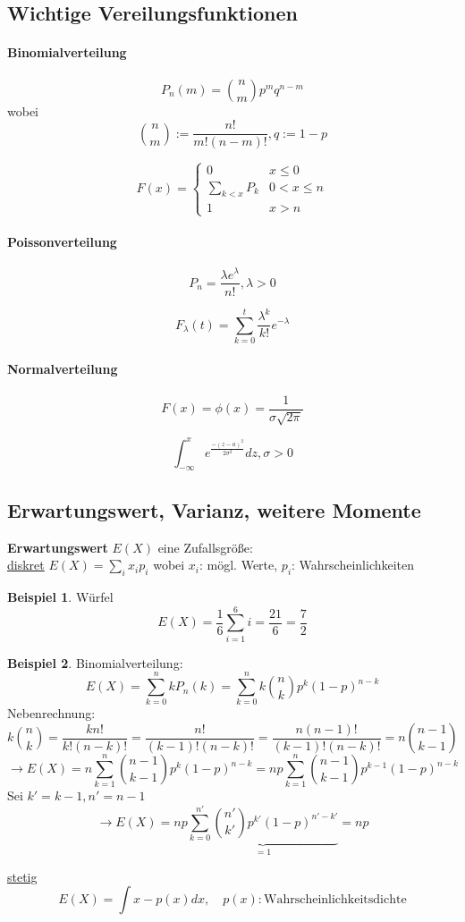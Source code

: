 \documentclass[10pt,a4paper]{article}
\theoremstyle{definition}
\newtheorem{exmp}{Beispiel}
\begin{document}
\subsection{Wichtige Vereilungsfunktionen}
\paragraph{Binomialverteilung}
\[ P_n(m)=\binom{n}{m}p^m q^{n-m} \] 
wobei \[ \binom{n}{m}:=\frac{n!}{m!(n-m)!}, q:= 1-p \] 

\[ F(x)=
  \begin{cases}
    0 & x \leq 0 \\
    \sum\limits_{k<x}P_k & 0 < x \leq n \\
    1 & x > n
  \end{cases}
\] 

\paragraph{Poissonverteilung}
\[ P_n=\frac{\lambda e^{\lambda}}{n!}, \lambda > 0 \]

\[ F_{\lambda}(t)=\sum_{k=0}^t \frac{\lambda^k}{k!}e^{-\lambda} \]

\paragraph{Normalverteilung}
\[ F(x)=\phi(x)=\frac{1}{\sigma\sqrt{2\pi}} \]

\[ \int_{-\infty}^x e^{\frac{-(z-a)^2}{2\sigma^2}} dz , \sigma > 0 \]

\subsection{Erwartungswert, Varianz, weitere Momente}
\textbf{Erwartungswert} $E(X)$ eine Zufallsgröße:\\
\underline{diskret} $E(X)=\sum_i x_i p_i$ wobei $x_i$: mögl. Werte, $p_i$: Wahrscheinlichkeiten \\

\begin{exmp}
	Würfel 
	\[ E(X)=\frac{1}{6} \sum_{i=1}^6 i = \frac{21}{6} = \frac{7}{2} \]
\end{exmp}
\begin{exmp}
	Binomialverteilung: 
	\[ E(X)= \sum_{k=0}^n k P_n(k) = \sum_{k=0}^n k \binom{n}{k} p^k(1-p)^{n-k} \] 
	Nebenrechnung:
	\[ k \binom{n}{k} = \frac{k n!}{k! (n-k)!} = \frac{n!}{(k-1)!(n-k)!} = \frac{n(n-1)!}{(k-1)!(n-k)!} = n \binom{n-1}{k-1} \] 
	\[\rightarrow E(X)= n \sum_{k=1}^{n} \binom{n-1}{k-1} p^k (1-p)^{n-k} = np \sum_{k=1}^n \binom{n-1}{k-1} p^{k-1} (1-p)^{n-k} \] 
	Sei $k'=k-1, n'=n-1$ \\
	\[ \rightarrow E(X)=np \underbrace{\sum_{k=0}^{n'} \binom{n'}{k'} p^{k'}(1-p)^{n'-k'}}_{=1} = np \]
	
	\underline{stetig} 
	\[ E(X)=\int x - p(x) dx , \quad p(x): \text{Wahrscheinlichkeitsdichte} \]
\end{exmp} 
\end{document}
